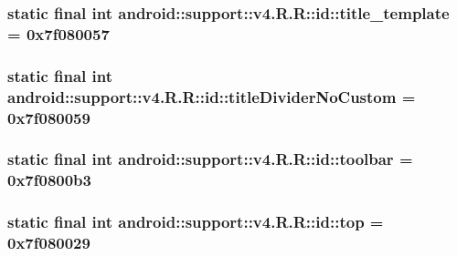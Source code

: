 \hypertarget{classandroid_1_1support_1_1v4_1_1_r_1_1id_a340dc7a6bb3fc1bec1611576b760045}{
\subsubsection[{title\_\-template}]{\setlength{\rightskip}{0pt plus 5cm}static final int android::support::v4.R.R::id::title\_\-template = 0x7f080057}}
\label{classandroid_1_1support_1_1v4_1_1_r_1_1id_a340dc7a6bb3fc1bec1611576b760045}


\hypertarget{classandroid_1_1support_1_1v4_1_1_r_1_1id_48a6a59ca71b80c5b88f4ab3b93e6994}{
\subsubsection[{titleDividerNoCustom}]{\setlength{\rightskip}{0pt plus 5cm}static final int android::support::v4.R.R::id::titleDividerNoCustom = 0x7f080059}}
\label{classandroid_1_1support_1_1v4_1_1_r_1_1id_48a6a59ca71b80c5b88f4ab3b93e6994}


\hypertarget{classandroid_1_1support_1_1v4_1_1_r_1_1id_6ac067002a34fdb9761ec4e512e1627b}{
\subsubsection[{toolbar}]{\setlength{\rightskip}{0pt plus 5cm}static final int android::support::v4.R.R::id::toolbar = 0x7f0800b3}}
\label{classandroid_1_1support_1_1v4_1_1_r_1_1id_6ac067002a34fdb9761ec4e512e1627b}


\hypertarget{classandroid_1_1support_1_1v4_1_1_r_1_1id_1dbc157b87faa98e10d64f4dbc032f70}{
\subsubsection[{top}]{\setlength{\rightskip}{0pt plus 5cm}static final int android::support::v4.R.R::id::top = 0x7f080029}}
\label{classandroid_1_1support_1_1v4_1_1_r_1_1id_1dbc157b87faa98e10d64f4dbc032f70}


